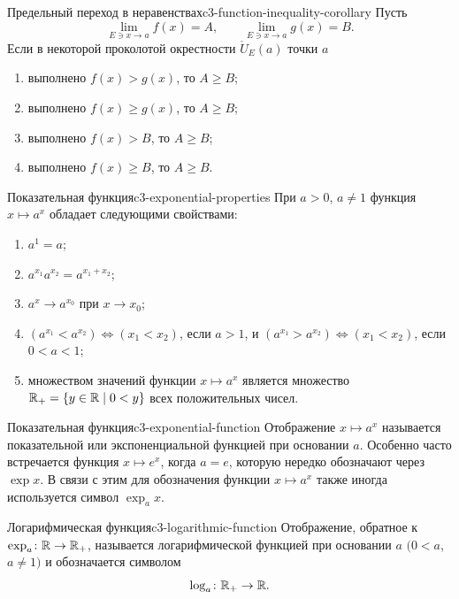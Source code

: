 \begin{corollary}{Предельный переход в неравенствах}{c3-function-inequality-corollary}
  Пусть
  \[
    \lim_{E\ni x\to a}f(x)=A,
    \qquad
    \lim_{E\ni x\to a}g(x)=B.
  \]
  Если в некоторой проколотой окрестности $\mathring U_E(a)$ точки $a$
  \begin{enumerate}[label=\alph*)]
    \item выполнено $f(x)>g(x)$, то $A\ge B$;
    \item выполнено $f(x)\ge g(x)$, то $A\ge B$;
    \item выполнено $f(x)>B$, то $A\ge B$;
    \item выполнено $f(x)\ge B$, то $A\ge B$.
  \end{enumerate}
\end{corollary}

\begin{properties}{Показательная функция}{c3-exponential-properties}
  При $a>0$, $a\ne1$ функция $x\mapsto a^x$ обладает следующими
  свойствами:
  \begin{enumerate}[label=\arabic*)]
    \item $a^1=a$;
    \item $a^{x_1}a^{x_2}=a^{x_1+x_2}$;
    \item $a^x\to a^{x_0}$ при $x\to x_0$;
    \item $(a^{x_1}<a^{x_2})\Leftrightarrow(x_1<x_2)$, если $a>1$,
      и $(a^{x_1}>a^{x_2})\Leftrightarrow(x_1<x_2)$, если $0<a<1$;
    \item множеством значений функции $x\mapsto a^x$ является множество
      $\mathbb{R}_+=\{y\in\mathbb{R}\mid 0<y\}$ всех положительных чисел.
  \end{enumerate}
\end{properties}

\begin{definition}{Показательная функция}{c3-exponential-function}
  Отображение $x\mapsto a^x$ называется показательной или экспоненциальной
  функцией при основании $a$. Особенно часто встречается функция
  $x\mapsto e^x$, когда $a=e$, которую нередко обозначают через $\exp x$.
  В связи с этим для обозначения функции $x\mapsto a^x$ также иногда
  используется символ $\exp_a x$.
\end{definition}

\begin{definition}{Логарифмическая функция}{c3-logarithmic-function}
  Отображение, обратное к $\exp_a\colon\mathbb{R}\to\mathbb{R}_+$, называется
  логарифмической функцией при основании $a$ $(0<a$, $a\ne1)$ и
  обозначается символом
  \[
    \log_a\colon\mathbb{R}_+\to\mathbb{R}.
  \]
\end{definition}

